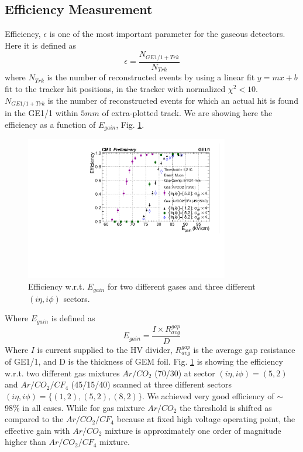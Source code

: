 \subsection{Efficiency Measurement}
Efficiency, $\epsilon$ is one of the most important parameter for the gaseous detectors. Here it is defined as 
\begin{equation}
\epsilon = \frac{N_{GE1/1+Trk}}{N_{Trk}}
\end{equation}
where $N_{Trk}$ is the number of reconstructed events by using a linear fit $y = mx + b$ fit to the tracker hit positions, in the tracker with normalized $\chi^2<10$.
$N_{GE1/1+Trk}$ is the number of reconstructed events for which an actual hit is found in the GE1/1 within $5mm$ of extra-plotted track.
We are showing here the efficiency as a function of $E_{gain}$, Fig. \ref{Efficiency}. 
\begin{figure}[!h]
\centering
\includegraphics[width=3.5in]{figures/GEM/EfficiencyPlot_wrt_EGain_wError4times_2gas.pdf}
\caption{Efficiency w.r.t. $E_{gain}$ for two different gases and three different $(i\eta,i\phi)$ sectors.}
\label{Efficiency}
\end{figure}
Where $E_{gain}$ is defined as
\begin{equation}
E_{gain} = \frac{I\times R_{avg}^{gap}}{D}
\end{equation}
Where $I$ is current supplied to the HV divider,
      $R_{avg}^{gap}$ is the average gap resistance of GE1/1,
      and D is the thickness of GEM foil.
      Fig. \ref{Efficiency} is showing the efficiency w.r.t. two different gas mixtures $Ar/CO_2$ (70/30) at sector $(i\eta,i\phi)=(5,2)$ and $Ar/CO_2/CF_4$ (45/15/40) scanned at three different sectors $(i\eta,i\phi)=\{(1,2),(5,2),(8,2)\}$. We achieved very good efficiency of $\sim$ 98\% in all cases. While for gas mixture $Ar/CO_2$ the threshold is shifted as compared to the $Ar/CO_2/CF_4$ because at fixed high voltage operating point, the effective gain with $Ar/CO_2$  mixture is approximately one order of magnitude higher than $Ar/CO_2/CF_4$ mixture.
      

